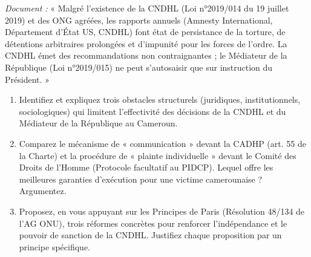\documentclass[11pt]{article}
\begin{document}
\begin{exercice}
    \textit{Document :} « Malgré l'existence de la CNDHL (Loi n°2019/014 du 19 juillet 2019) et des ONG agréées, les rapports annuels (Amnesty International, Département d'État US, CNDHL) font état de persistance de la torture, de détentions arbitraires prolongées et d'impunité pour les forces de l'ordre. La CNDHL émet des recommandations non contraignantes ; le Médiateur de la République (Loi n°2019/015) ne peut s'autosaisir que sur instruction du Président. »
    \begin{enumerate}
        \item Identifiez et expliquez trois obstacles structurels (juridiques, institutionnels, sociologiques) qui limitent l'effectivité des décisions de la CNDHL et du Médiateur de la République au Cameroun.
        \item Comparez le mécanisme de « communication » devant la CADHP (art. 55 de la Charte) et la procédure de « plainte individuelle » devant le Comité des Droits de l'Homme (Protocole facultatif au PIDCP). Lequel offre les meilleures garanties d'exécution pour une victime camerounaise ? Argumentez.
        \item Proposez, en vous appuyant sur les Principes de Paris (Résolution 48/134 de l'AG ONU), trois réformes concrètes pour renforcer l'indépendance et le pouvoir de sanction de la CNDHL. Justifiez chaque proposition par un principe spécifique.
    \end{enumerate}
\end{exercice}
\end{document}
